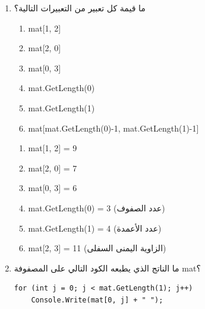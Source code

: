 \documentclass[14pt]{extarticle}
\begin{document}
\begin{enumerate}[itemsep=2em]

\item
ما قيمة كل تعبير من التعبيرات التالية؟

\begin{enumerate}[itemsep=6pt]
    \item \textenglish{mat[1, 2]}
    \item \textenglish{mat[2, 0]}
    \item \textenglish{mat[0, 3]}
    \item \textenglish{mat.GetLength(0)}
    \item \textenglish{mat.GetLength(1)}
    \item \textenglish{mat[mat.GetLength(0)-1, mat.GetLength(1)-1]}
\end{enumerate}

\ifwithsols
\begin{boxSolution}
\begin{enumerate}[itemsep=4pt]
    \item \textenglish{mat[1, 2] = 9}
    \item \textenglish{mat[2, 0] = 7}
    \item \textenglish{mat[0, 3] = 6}
    \item \textenglish{mat.GetLength(0) = 3} \quad (عدد الصفوف)
    \item \textenglish{mat.GetLength(1) = 4} \quad (عدد الأعمدة)
    \item \textenglish{mat[2, 3] = 11} \quad (الزاوية اليمنى السفلى)
\end{enumerate}
\end{boxSolution}
\clearpage
\fi

\item
ما الناتج الذي يطبعه الكود التالي على المصفوفة \textenglish{mat}؟

\begin{boxCode}
\begin{english}
\begin{verbatim}
for (int j = 0; j < mat.GetLength(1); j++)
    Console.Write(mat[0, j] + " ");
\end{verbatim}
\end{english}
\end{boxCode}


\end{enumerate}
\end{document}
